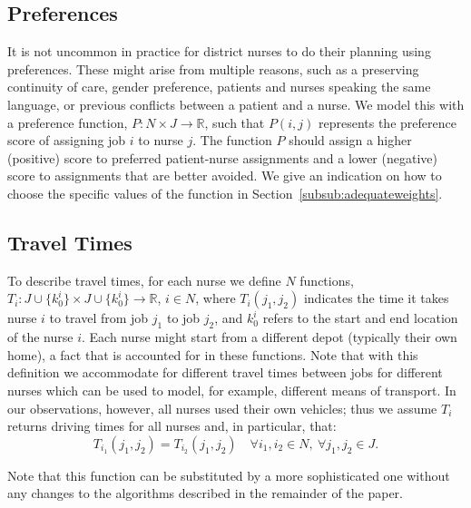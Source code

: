 \documentclass[a4paper,11pt,authoryear]{elsarticle}
\begin{document}
\subsection{Preferences}
\label{sub:preferences}
\noindent It is not uncommon in practice for district nurses to do their planning using preferences. These might arise from multiple reasons, such as a preserving continuity of care, gender preference, patients and nurses speaking the same language, or previous conflicts between a patient and a nurse. We model this with a preference function, $P: N\times J \rightarrow \mathbb{R}$, such that $P(i,j)$ represents the preference score of assigning job $i$ to nurse $j$. The function $P$ should assign a higher (positive) score to preferred patient-nurse assignments and a lower (negative) score to assignments that are better avoided. We give an indication on how to choose the specific values of the function in Section~\ref{subsub:adequateweights}.

\subsection{Travel Times}
\label{sub:traveltimes}
\noindent To describe travel times, for each nurse we define $N$ functions, $T_i: J\cup\{k^i_0\} \times J\cup\{k^i_0\} \rightarrow \mathbb{R}$, $i \in N$, where $T_i(j_1, j_2)$ indicates the time it takes nurse $i$ to travel from job $j_1$ to job $j_2$, and $k^i_0$ refers to the start and end location of the nurse $i$. Each nurse might start from a different depot (typically their own home), a fact that is accounted for in these functions. Note that with this definition we accommodate for different travel times between jobs for different nurses which can be used to model, for example, different means of transport. In our observations, however, all nurses used their own vehicles; thus we assume $T_i$ returns driving times for all nurses and, in particular, that:
\begin{equation}
    T_{i_1}(j_1, j_2) = T_{i_2}(j_1, j_2)\quad  \forall i_1, i_2 \in N,\ \forall j_1, j_2 \in J. \label{eq:traveltimeequality}
\end{equation} 

\noindent Note that this function can be substituted by a more sophisticated one without any changes to the algorithms described in the remainder of the paper.
\end{document}
